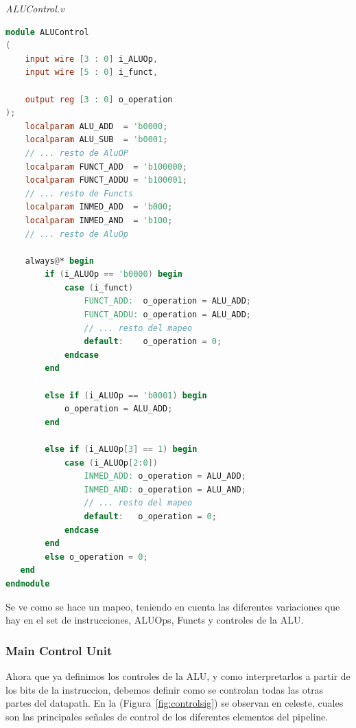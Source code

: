 \documentclass[12pt]{article}
\begin{document}
\noindent \textit{ALUControl.v}
\begin{lstlisting}[language=verilog]
module ALUControl
(
    input wire [3 : 0] i_ALUOp,
    input wire [5 : 0] i_funct,

    output reg [3 : 0] o_operation
);
    localparam ALU_ADD  = 'b0000;
    localparam ALU_SUB  = 'b0001;
    // ... resto de AluOP
    localparam FUNCT_ADD  = 'b100000;
    localparam FUNCT_ADDU = 'b100001;
    // ... resto de Functs
    localparam INMED_ADD  = 'b000;
    localparam INMED_AND  = 'b100;
    // ... resto de AluOp

    always@* begin
        if (i_ALUOp == 'b0000) begin
            case (i_funct)
                FUNCT_ADD:  o_operation = ALU_ADD;
                FUNCT_ADDU: o_operation = ALU_ADD;
                // ... resto del mapeo
                default:    o_operation = 0;
            endcase
        end

        else if (i_ALUOp == 'b0001) begin
            o_operation = ALU_ADD;
        end

        else if (i_ALUOp[3] == 1) begin
            case (i_ALUOp[2:0])
                INMED_ADD: o_operation = ALU_ADD;
                INMED_AND: o_operation = ALU_AND;
                // ... resto del mapeo
                default:   o_operation = 0;
            endcase
        end
        else o_operation = 0;
   end
endmodule
\end{lstlisting}

\noindent Se ve como se hace un mapeo, teniendo en cuenta las diferentes variaciones que hay en el set de instrucciones, ALUOps, Functs y controles de la ALU.

\subsubsection{Main Control Unit}

Ahora que ya definimos los controles de la ALU, y como interpretarlos a partir de los bits de la instruccion, debemos definir como se controlan todas las otras partes del datapath. En la (Figura~\ref{fig:controlsig}) se observan en celeste, cuales son las principales señales de control de los diferentes elementos del pipeline.
\end{document}
